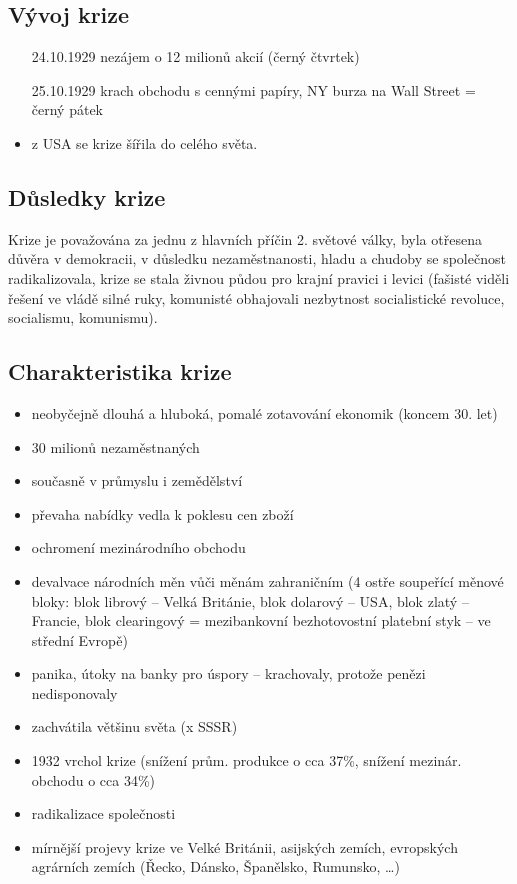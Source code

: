 \documentclass{article}
\begin{document}
\subsection*{Vývoj krize}
\begin{itemize}
    \item[24.10.1929] nezájem o 12 milionů akcií (černý čtvrtek)
    \item[25.10.1929] krach obchodu s cennými papíry, NY burza na Wall Street = černý pátek
    \item z USA se krize šířila do celého světa.
\end{itemize}

\subsection*{Důsledky krize}
Krize je považována za jednu z hlavních příčin 2. světové války, byla otřesena důvěra v demokracii, v důsledku nezaměstnanosti, hladu a chudoby se společnost radikalizovala, krize se stala živnou půdou pro krajní pravici i levici (fašisté viděli řešení ve vládě silné ruky, komunisté obhajovali nezbytnost socialistické revoluce, socialismu, komunismu).

\subsection*{Charakteristika krize}
\begin{itemize}
    \item neobyčejně dlouhá a hluboká, pomalé zotavování ekonomik (koncem 30. let)
    \item 30 milionů nezaměstnaných
    \item současně v průmyslu i zemědělství
    \item převaha nabídky vedla k poklesu cen zboží
    \item ochromení mezinárodního obchodu
    \item devalvace národních měn vůči měnám zahraničním (4 ostře soupeřící měnové bloky: blok librový – Velká Británie, blok dolarový – USA, blok zlatý – Francie, blok clearingový = mezibankovní bezhotovostní platební styk – ve střední Evropě)
    \item panika, útoky na banky pro úspory – krachovaly, protože penězi nedisponovaly
    \item zachvátila většinu světa (x SSSR)
    \item 1932 vrchol krize (snížení prům. produkce o cca 37\%, snížení mezinár. obchodu o cca 34\%)
    \item radikalizace společnosti
    \item mírnější projevy krize ve Velké Británii, asijských zemích, evropských agrárních zemích (Řecko, Dánsko, Španělsko, Rumunsko, \dots)
\end{itemize}
\end{document}
